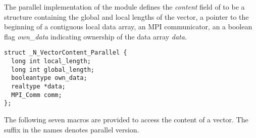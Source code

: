 %
The parallel implementation of the {\nvector} module defines the {\em content} 
field of  to be a structure containing the global and local lengths 
of the vector, a pointer to the beginning of a contiguous local data array,
an MPI communicator, an a boolean flag {\em own\_data} indicating ownership of 
the data array {\em data}.
\begin{verbatim} 
struct _N_VectorContent_Parallel {
  long int local_length;
  long int global_length;
  booleantype own_data;
  realtype *data;
  MPI_Comm comm;
};
\end{verbatim}
The following seven macros are provided to access the content of a {\nvecp}
vector. The suffix  in the names denotes parallel version.
